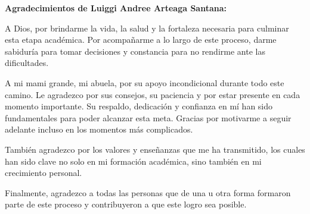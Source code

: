 \begin{center}
        \vspace*{2cm}
        \raggedright
        \textbf{Agradecimientos de Luiggi Andree Arteaga Santana:}

        A Dios, por brindarme la vida, la salud y la fortaleza necesaria para culminar esta etapa académica. Por acompañarme a lo largo de este proceso, darme sabiduría para tomar decisiones y constancia para no rendirme ante las dificultades.

        A mi mami grande, mi abuela, por su apoyo incondicional durante todo este camino. Le agradezco por sus consejos, su paciencia y por estar presente en cada momento importante. Su respaldo, dedicación y confianza en mí han sido fundamentales para poder alcanzar esta meta. Gracias por motivarme a seguir adelante incluso en los momentos más complicados.

        También agradezco por los valores y enseñanzas que me ha transmitido, los cuales han sido clave no solo en mi formación académica, sino también en mi crecimiento personal.

        Finalmente, agradezco a todas las personas que de una u otra forma formaron parte de este proceso y contribuyeron a que este logro sea posible.

        \vspace{8cm}
    \end{center}
\clearpage
